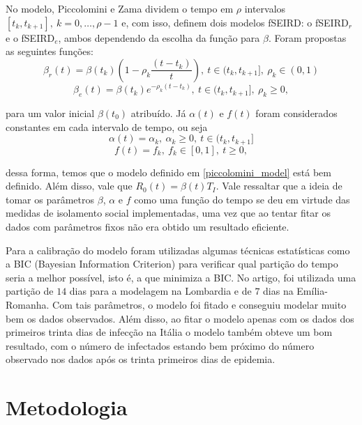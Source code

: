 \documentclass{article}
\begin{document}
	No modelo, Piccolomini e Zama dividem o tempo em $\rho$ intervalos $[t_k, t_{k + 1}], ~k = 0, \dots, \rho -1$ e, com isso, definem dois modelos fSEIRD: o fSEIRD$_r$ e o fSEIRD$_e$, ambos dependendo da escolha da função para $\beta$. Foram propostas as seguintes funções:
	\[\beta_r(t) = \beta(t_k)\left(1 - \rho_k\dfrac{(t - t_k)}{t}\right), ~t \in (t_k, t_{k + 1}], ~\rho_k \in (0, 1)\]
	\[\beta_e(t) = \beta(t_k)e^{- \rho_k(t - t_k)}, ~t \in (t_k, t_{k + 1}], ~\rho_k \geq 0,\]
	
	\noindent para um valor inicial $\beta(t_0)$ atribuído. Já $\alpha(t)$ e $f(t)$ foram considerados constantes em cada intervalo de tempo, ou seja
	\[\alpha(t) = \alpha_k, ~\alpha_k \geq 0, ~t \in (t_k, t_{k + 1}]\]
	\[f(t) = f_k, ~f_k \in [0, 1], ~t \geq 0,\]
	
	\noindent dessa forma, temos que o modelo definido em \ref{piccolomini_model} está bem definido. Além disso, vale que $R_0(t) = \beta(t)T_I$. Vale ressaltar que a ideia de tomar os parâmetros $\beta$, $\alpha$ e $f$ como uma função do tempo se deu em virtude das medidas de isolamento social implementadas, uma vez que ao tentar fitar os dados com parâmetros fixos não era obtido um resultado eficiente.
	
	Para a calibração do modelo foram utilizadas algumas técnicas estatísticas como a BIC (Bayesian Information Criterion) para verificar qual partição do tempo seria a melhor possível, isto é, a que minimiza a BIC. No artigo, foi utilizada uma partição de $14$ dias para a modelagem na Lombardia e de $7$ dias na Emília-Romanha. Com tais parâmetros, o modelo foi fitado e conseguiu modelar muito bem os dados observados. Além disso, ao fitar o modelo apenas com os dados dos primeiros trinta dias de infecção na Itália o modelo também obteve um bom resultado, com o número de infectados estando bem próximo do número observado nos dados após os trinta primeiros dias de epidemia.
	
	\section{Metodologia}
	
\end{document}
